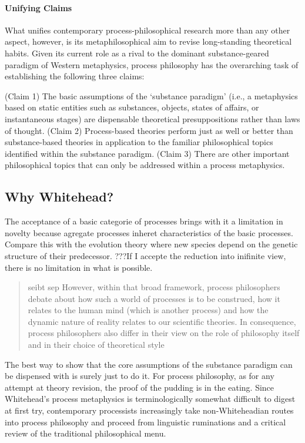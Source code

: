 {\paragraph{Unifying Claims}

What unifies contemporary process-philosophical research more than any other aspect, however, is its metaphilosophical aim to revise long-standing theoretical habits. Given its current role as a rival to the dominant substance-geared paradigm of Western metaphysics, process philosophy has the overarching task of establishing the following three claims:

(Claim 1) The basic assumptions of the ‘substance paradigm’ (i.e., a metaphysics based on static entities such as substances, objects, states of affairs, or instantaneous stages) are dispensable theoretical presuppositions rather than laws of thought.
(Claim 2) Process-based theories perform just as well or better than substance-based theories in application to the familiar philosophical topics identified within the substance paradigm.
(Claim 3) There are other important philosophical topics that can only be addressed within a process metaphysics.

\subsection{Why Whitehead?}

The acceptance of a basic categorie of processes brings with it a limitation in novelty because agregate processes inheret characteristics of the basic processes. Compare this with the evolution theory where new species depend on the genetic structure of their predecessor.
???If I accepte the reduction into inifinite view, there is no limitation in what is possible.

\begin{quotation}
	seibt sep
	However, within that broad framework, process philosophers debate about how such a world of processes is to be construed, how it relates to the human mind (which is another process) and how the dynamic nature of reality relates to our scientific theories. In consequence, process philosophers also differ in their view on the role of philosophy itself and in their choice of theoretical style
	
\end{quotation}

The best way to show that the core assumptions of the substance paradigm can be dispensed with is surely just to do it. For process philosophy, as for any attempt at theory revision, the proof of the pudding is in the eating. Since Whitehead's process metaphysics is terminologically somewhat difficult to digest at first try, contemporary processists increasingly take non-Whiteheadian routes into process philosophy and proceed from linguistic ruminations and a critical review of
the traditional philosophical menu.

}
